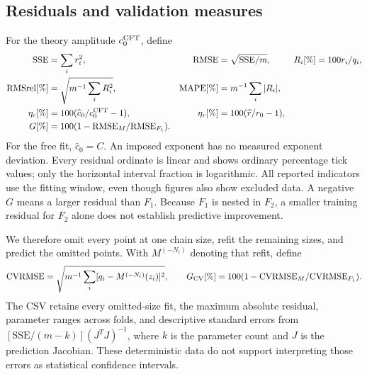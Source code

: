 \subsection{Residuals and validation measures}
For the theory amplitude $c_0^{\rm CFT}$, define
\begin{align}
 \mathrm{SSE}&=\sum_i r_i^2,&
 \mathrm{RMSE}&=\sqrt{\mathrm{SSE}/m},& R_i[\%]&=100r_i/q_i,\nonumber\\
 \mathrm{RMSrel}[\%]&=\sqrt{m^{-1}\sum_i R_i^2},&
 \mathrm{MAPE}[\%]&=m^{-1}\sum_i|R_i|,\nonumber\\
 \eta_c[\%]&=100(\widehat c_0/c_0^{\rm CFT}-1),&
 \eta_r[\%]&=100(\widehat r/r_0-1),\nonumber\\
 G[\%]&=100(1-\mathrm{RMSE}_M/\mathrm{RMSE}_{F_1}).
 \label{eq:metrics}
\end{align}
For the free fit, $\widehat c_0=C$. An imposed exponent has no measured
exponent deviation. Every residual ordinate is linear and shows ordinary
percentage tick values; only the horizontal interval fraction is logarithmic.
All reported indicators use the fitting window, even though figures
also show excluded data. A negative $G$ means a larger residual than $F_1$.
Because $F_1$ is nested in $F_2$, a smaller training residual for $F_2$
alone does not establish predictive improvement.

We therefore omit every point at one chain size, refit the remaining
sizes, and predict the omitted points. With $M^{(-N_i)}$ denoting that
refit, define
\begin{equation}
 \mathrm{CVRMSE}=\sqrt{m^{-1}\sum_i[q_i-M^{(-N_i)}(z_i)]^2},\qquad
 G_{\rm CV}[\%]=100(1-\mathrm{CVRMSE}_M/\mathrm{CVRMSE}_{F_1}).
 \label{eq:cv}
\end{equation}
The CSV retains every omitted-size fit, the maximum absolute residual,
parameter ranges across folds, and descriptive standard errors from
$[\mathrm{SSE}/(m-k)](J^TJ)^{-1}$, where $k$ is the parameter count
and $J$ is the prediction Jacobian. These deterministic data do not
support interpreting those errors as statistical confidence intervals.

